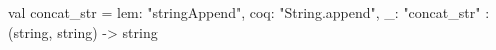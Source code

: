 val concat_str = {lem: "stringAppend", coq: "String.append", _: "concat_str"} : (string, string) -> string
